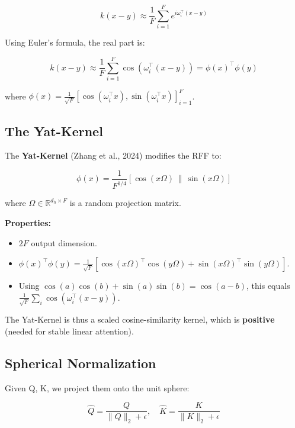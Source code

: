 \begin{equation}
k(x - y) \approx \frac{1}{F} \sum_{i=1}^{F} e^{i \omega_i^\top (x - y)}
\end{equation}

Using Euler's formula, the real part is:

\begin{equation}
k(x - y) \approx \frac{1}{F} \sum_{i=1}^{F} \cos(\omega_i^\top (x - y))
= \phi(x)^\top \phi(y)
\end{equation}

where $\phi(x) = \frac{1}{\sqrt{F}} [\cos(\omega_i^\top x), \sin(\omega_i^\top x)]_{i=1}^F$.

\subsection{The Yat-Kernel}

The \textbf{Yat-Kernel} (Zhang et al., 2024) modifies the RFF to:

\begin{equation}
\phi(x) = \frac{1}{F^{1/4}} [\cos(x \Omega) \,\|\, \sin(x \Omega)]
\end{equation}

where $\Omega \in \mathbb{R}^{d_h \times F}$ is a random projection matrix.

\textbf{Properties:}

\begin{itemize}
\item $2F$ output dimension.
\item $\phi(x)^\top \phi(y) = \frac{1}{\sqrt{F}} [\cos(x\Omega)^\top \cos(y\Omega) + \sin(x\Omega)^\top \sin(y\Omega)]$.
\item Using $\cos(a)\cos(b) + \sin(a)\sin(b) = \cos(a - b)$, this equals
  $\frac{1}{\sqrt{F}} \sum_i \cos(\omega_i^\top (x - y))$.

\end{itemize}
The Yat-Kernel is thus a scaled cosine-similarity kernel, which is 
\textbf{positive} (needed for stable linear attention).

\subsection{Spherical Normalization}

Given Q, K, we project them onto the unit sphere:

\begin{equation}
\hat{Q} = \frac{Q}{\|Q\|_2 + \epsilon}, \quad
\hat{K} = \frac{K}{\|K\|_2 + \epsilon}
\end{equation}

